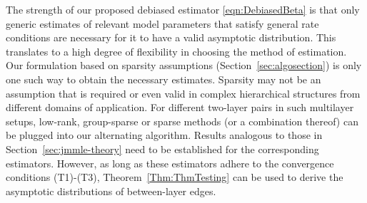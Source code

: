 The strength of our proposed debiased estimator \eqref{eqn:DebiasedBeta} is that only generic estimates of relevant model parameters that satisfy general rate conditions are necessary for it to have a valid asymptotic distribution. This translates to a high degree of flexibility in choosing the method of estimation. Our formulation based on sparsity assumptions (Section~\ref{sec:algosection}) is only one such way to obtain the necessary estimates. Sparsity may not be an assumption that is required or even valid in complex hierarchical structures from different domains of application. For different two-layer pairs in such multilayer setups, low-rank, group-sparse or sparse methods (or a combination thereof) can be plugged into our alternating algorithm. Results analogous to those in Section~\ref{sec:jmmle-theory} need to be established for the corresponding estimators. However, as long as these estimators adhere to the convergence conditions (T1)-(T3), Theorem~\ref{Thm:ThmTesting} can be used to derive the asymptotic distributions of between-layer edges.
